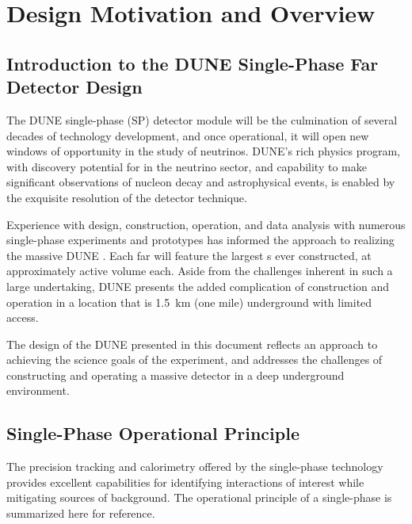 \chapter{Design Motivation and Overview}
\label{ch:fdsp-apa-design}

\section{Introduction to the DUNE Single-Phase Far Detector Design}
\label{sec:fdsp-design-intro}

The DUNE single-phase (SP) \lartpc detector module will be the culmination of several decades
of \lartpc technology development, and once operational, it will open new windows of opportunity in the study of neutrinos.  DUNE's rich physics program, with discovery
potential for  in the neutrino sector, and capability to make
significant observations of nucleon decay and astrophysical events, is enabled
by the exquisite resolution of the \lartpc detector technique.

Experience with design, construction, operation, and data
analysis with numerous single-phase \lartpc experiments and prototypes has informed the approach to
realizing the massive DUNE . Each far  will feature the largest \lartpc{}s ever
constructed, at approximately \nominalmodsize active volume each.  Aside from the
challenges inherent in such a large undertaking, DUNE presents the added complication of construction and operation in a location
that is \SI{1.5}{km} (one mile) underground with limited access.

The design of the DUNE  presented in this document
reflects an approach to achieving the science goals of the experiment, and
addresses the challenges of constructing and operating a massive detector in a deep
underground environment.


\section{Single-Phase \lartpc Operational Principle}
\label{sec:fdsp-design-op}

The precision tracking and calorimetry offered by the single-phase \lartpc
technology provides excellent capabilities for identifying interactions of interest
while mitigating sources of background.  The operational principle of a
single-phase \lartpc is summarized here for reference.

